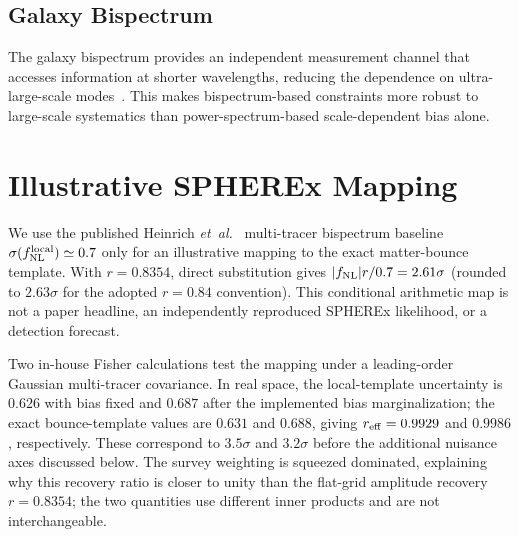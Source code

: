 \documentclass[aps,prd,twocolumn,superscriptaddress,showpacs,preprintnumbers,nofootinbib,longbibliography,floatfix]{revtex4-2}
\newcommand{\fnl}{f_{\rm NL}}
\newcommand{\etal}{\textit{et~al.}}
\begin{document}
\subsection{Galaxy Bispectrum}

The galaxy bispectrum provides an independent measurement channel that accesses information at shorter wavelengths, reducing the dependence on ultra-large-scale modes~\cite{Heinrich:2023}. This makes bispectrum-based constraints more robust to large-scale systematics than power-spectrum-based scale-dependent bias alone.

\section{Illustrative SPHEREx Mapping}
\label{sec:spherex}

We use the published Heinrich \etal~\cite{Heinrich:2023} multi-tracer bispectrum baseline $\sigma(\fnl^{\rm local})\simeq0.7$ only for an illustrative mapping to the exact matter-bounce template. With $r=0.8354$, direct substitution gives $|\fnl|r/0.7=2.61\sigma$ (rounded to $2.63\sigma$ for the adopted $r=0.84$ convention). This conditional arithmetic map is not a paper headline, an independently reproduced SPHEREx likelihood, or a detection forecast.

Two in-house Fisher calculations test the mapping under a leading-order Gaussian multi-tracer covariance. In real space, the local-template uncertainty is $0.626$ with bias fixed and $0.687$ after the implemented bias marginalization; the exact bounce-template values are $0.631$ and $0.688$, giving $r_{\rm eff}=0.9929$ and $0.9986$, respectively. These correspond to $3.5\sigma$ and $3.2\sigma$ before the additional nuisance axes discussed below. The survey weighting is squeezed dominated, explaining why this recovery ratio is closer to unity than the flat-grid amplitude recovery $r=0.8354$; the two quantities use different inner products and are not interchangeable.
\end{document}
